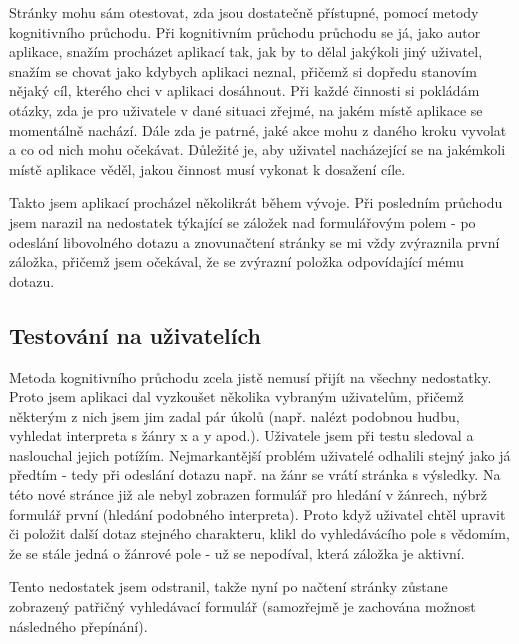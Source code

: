 Stránky mohu sám otestovat, zda jsou dostatečně přístupné, pomocí metody kognitivního průchodu.
Při kognitivním průchodu průchodu se já, jako autor aplikace, snažím procházet aplikací tak, jak by to dělal jakýkoli jiný uživatel, snažím se chovat jako kdybych aplikaci neznal, přičemž si dopředu stanovím nějaký cíl, kterého chci v aplikaci dosáhnout.
Při každé činnosti si pokládám otázky, zda je pro uživatele v dané situaci zřejmé, na jakém místě aplikace se momentálně nachází. Dále zda je patrné, jaké akce mohu z daného kroku vyvolat a co od nich mohu očekávat.
Důležité je, aby uživatel nacházející se na jakémkoli místě aplikace věděl, jakou činnost musí vykonat k dosažení cíle.

Takto jsem aplikací procházel několikrát během vývoje.
Při posledním průchodu jsem narazil na nedostatek týkající se záložek nad formulářovým polem - po odeslání libovolného dotazu a znovunačtení stránky se mi vždy zvýraznila první záložka, přičemž jsem očekával, že se zvýrazní položka odpovídající mému dotazu.

\subsection{Testování na uživatelích}

Metoda kognitivního průchodu zcela jistě nemusí přijít na všechny nedostatky. 
Proto jsem aplikaci dal vyzkoušet několika vybraným uživatelům, přičemž některým z nich jsem jim zadal pár úkolů (např. nalézt podobnou hudbu, vyhledat interpreta s žánry x a y apod.).
Uživatele jsem při testu sledoval a naslouchal jejich potížím. Nejmarkantější problém uživatelé odhalili stejný jako já předtím - tedy při odeslání dotazu např. na žánr se vrátí stránka s výsledky. Na této nové stránce již ale nebyl zobrazen formulář pro hledání v žánrech, nýbrž formulář první (hledání podobného interpreta).
Proto když uživatel chtěl upravit či položit další dotaz stejného charakteru, klikl do vyhledávácího pole s vědomím, že se stále jedná o žánrové pole - už se nepodíval, která záložka je aktivní. 

Tento nedostatek jsem odstranil, takže nyní po načtení stránky zůstane zobrazený patřičný vyhledávací formulář (samozřejmě je zachována možnost následného přepínání).